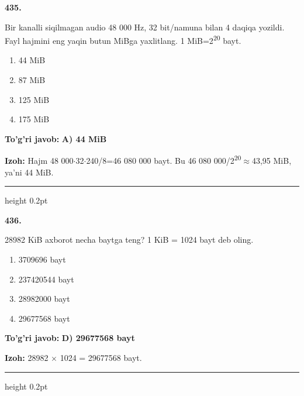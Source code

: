\documentclass[10pt,a4paper,oneside]{article}
\begin{document}
\noindent\textbf{\color{ink}435.}
\par
Bir kanalli siqilmagan audio 48 000 Hz, 32 bit/namuna bilan 4 daqiqa yozildi. Fayl hajmini eng yaqin butun MiBga yaxlitlang. 1 MiB=2\textsuperscript{2}\textsuperscript{0} bayt.
\begin{enumerate}[label=\Alph*),leftmargin=9mm]
\item 44 MiB
\item 87 MiB
\item 125 MiB
\item 175 MiB
\end{enumerate}
\begin{tcolorbox}[enhanced,breakable,colback=teal!4,colframe=teal!50!black,boxrule=0.5pt,arc=1.1mm,left=3mm,right=3mm,top=1.7mm,bottom=1.7mm,before skip=2mm,after skip=2mm]
\textbf{\color{teal}To'g'ri javob:} \textbf{A) 44 MiB}
\par\smallskip
\textbf{Izoh:} Hajm 48 000\ensuremath{\cdot}32\ensuremath{\cdot}240/8=46 080 000 bayt. Bu 46 080 000/2\textsuperscript{2}\textsuperscript{0}\ensuremath{\approx}43,95 MiB, ya'ni 44 MiB.
\end{tcolorbox}
\vspace{2mm}\hrule height 0.2pt \vspace{3mm}

\noindent\textbf{\color{ink}436.}
\par
28982 KiB axborot necha baytga teng? 1 KiB = 1024 bayt deb oling.
\begin{enumerate}[label=\Alph*),leftmargin=9mm]
\item 3709696 bayt
\item 237420544 bayt
\item 28982000 bayt
\item 29677568 bayt
\end{enumerate}
\begin{tcolorbox}[enhanced,breakable,colback=teal!4,colframe=teal!50!black,boxrule=0.5pt,arc=1.1mm,left=3mm,right=3mm,top=1.7mm,bottom=1.7mm,before skip=2mm,after skip=2mm]
\textbf{\color{teal}To'g'ri javob:} \textbf{D) 29677568 bayt}
\par\smallskip
\textbf{Izoh:} 28982 \ensuremath{\times} 1024 = 29677568 bayt.
\end{tcolorbox}
\vspace{2mm}\hrule height 0.2pt \vspace{3mm}
\end{document}
